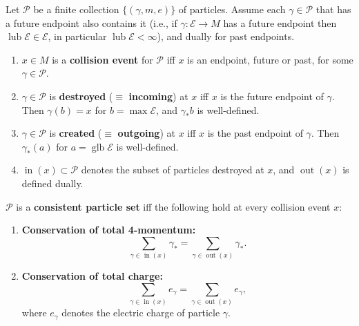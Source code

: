 Let $\mathcal{P}$ be a finite collection $\{(\gamma, m, e)\}$ of particles. Assume each $\gamma \in \mathcal{P}$ that has a future endpoint also contains it (i.e., if $\gamma: \mathcal{E} \rightarrow M$ has a future endpoint then $\operatorname{lub} \mathcal{E} \in \mathcal{E}$, in particular $\operatorname{lub} \mathcal{E} < \infty$), and dually for past endpoints.

\begin{enumerate}
  \item $x \in M$ is a \textbf{collision event} for $\mathcal{P}$ iff $x$ is an endpoint, future or past, for some $\gamma \in \mathcal{P}$.
  \item $\gamma \in \mathcal{P}$ is \textbf{destroyed} ($\equiv$ \textbf{incoming}) at $x$ iff $x$ is the future endpoint of $\gamma$. Then $\gamma(b) = x$ for $b = \max \mathcal{E}$, and $\gamma_*b$ is well-defined.
  \item $\gamma \in \mathcal{P}$ is \textbf{created} ($\equiv$ \textbf{outgoing}) at $x$ iff $x$ is the past endpoint of $\gamma$. Then $\gamma_*(a)$ for $a = \operatorname{glb} \mathcal{E}$ is well-defined.
  \item $\operatorname{in}(x) \subset \mathcal{P}$ denotes the subset of particles destroyed at $x$, and $\operatorname{out}(x)$ is defined dually.
\end{enumerate}

$\mathcal{P}$ is a \textbf{consistent particle set} iff the following hold at every collision event $x$:

\begin{enumerate}
  \item[(a)] \textbf{Conservation of total 4-momentum:}
    $$\sum_{\gamma \in \operatorname{in}(x)} \gamma_* = \sum_{\gamma \in \operatorname{out}(x)} \gamma_*.$$
  \item[(b)] \textbf{Conservation of total charge:}
    $$\sum_{\gamma \in \operatorname{in}(x)} e_\gamma = \sum_{\gamma \in \operatorname{out}(x)} e_\gamma,$$
    where $e_\gamma$ denotes the electric charge of particle $\gamma$.
\end{enumerate}
